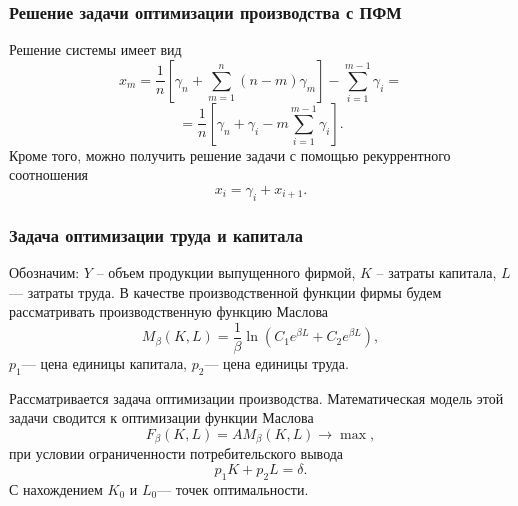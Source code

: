 \documentclass[10pt, pdf, hyperref={unicode}]{beamer}
\begin{document}
    \begin{frame}
        \frametitle{Решение задачи оптимизации производства с ПФМ}
        \begin{center}
            \begin{minipage}[h]{0.97\linewidth}
                Решение системы имеет вид
                $$x_m=\frac1n\left[\gamma_n+\sum_{m=1}^n(n-m)\gamma_m\right]-\sum_{i=1}^{m-1}\gamma_i=$$
                \begin{equation}\label{f2413}
                =\frac1n\left[\gamma_n+\gamma_i-m\sum_{i=1}^{m-1}\gamma_i\right].
                \end{equation}
                Кроме того, можно получить решение задачи с помощью рекуррентного соотношения
                \begin{equation}\label{f2415}
                x_i=\gamma_i+x_{i+1}.
                \end{equation}
            \end{minipage}
        \end{center}
    \end{frame}

    \begin{frame}
        \frametitle{Задача оптимизации труда и капитала}
        \begin{center}
            \begin{minipage}[h]{0.97\linewidth}
                Обозначим: $Y$ -- объем продукции выпущенного фирмой, $K$ -- затраты капитала, $L$ --- затраты труда. В качестве производственной функции фирмы будем рассматривать производственную функцию Маслова
                \begin{equation}\label{f251}
                M_\beta(K,L)=\frac1\beta\ln\left(C_1e^{\beta L}+C_2e^{\beta L}\right),
                \end{equation}
                $p_1$--- цена единицы капитала, $p_2$--- цена единицы труда.
                
                Рассматривается задача оптимизации производства. Математическая модель этой задачи сводится к оптимизации функции Маслова
                \begin{equation}\label{f252}
                F_\beta(K,L)=AM_\beta(K,L)\to\max,
                \end{equation}
                при условии ограниченности потребительского вывода
                \begin{equation}\label{f253}
                p_1K+p_2L=\delta.
                \end{equation}
                С нахождением $K_0$ и $L_0$--- точек оптимальности.
            \end{minipage}
        \end{center}
    \end{frame}
\end{document}
